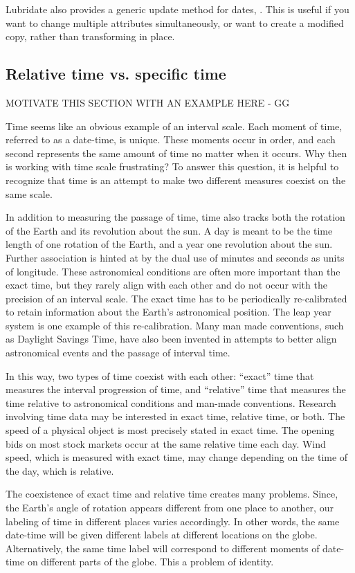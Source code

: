 \documentclass[article]{jss}
\begin{document}
Lubridate also provides a generic update method for dates, .  This is useful if you want to change multiple attributes simultaneously, or want to create a modified copy, rather than transforming in place.

\subsection{Relative time vs. specific time}

MOTIVATE THIS SECTION WITH AN EXAMPLE HERE - GG

Time seems like an obvious example of an interval scale. Each moment of time, referred to as a date-time, is unique.  These moments occur in order, and each second represents the same amount of time no matter when it occurs.  Why then is working with time scale frustrating? To answer this question, it is helpful to recognize that time is an attempt to make two different measures coexist on the same scale. 

In addition to measuring the passage of time, time also tracks both the rotation of the Earth and its revolution about the sun.  A day is meant to be the time length of one rotation of the Earth, and a year one revolution about the sun.  Further association is hinted at by the dual use of minutes and seconds as units of longitude.  These astronomical conditions are often more important than the exact time, but they rarely align with each other and do not occur with the precision of an interval scale.  The exact time has to be periodically re-calibrated to retain information about the Earth's astronomical position.  The leap year system is one example of this re-calibration. Many man made conventions, such as Daylight Savings Time, have also been invented in attempts to better align astronomical events and the passage of interval time.

In this way, two types of time coexist with each other: ``exact'' time that measures the interval progression of time, and ``relative'' time that measures the time relative to astronomical conditions and man-made conventions. Research involving time data may be interested in exact time, relative time, or both. The speed of a physical object is most precisely stated in exact time. The opening bids on most stock markets occur at the same relative time each day.  Wind speed, which is measured with exact time, may change depending on the time of the day, which is relative. 

The coexistence of exact time and relative time creates many problems. Since, the Earth's angle of rotation appears different from one place to another, our labeling of time in different places varies accordingly. In other words, the same date-time will be given different labels at different locations on the globe. Alternatively, the same time label will correspond to different moments of date-time on different parts of the globe.  This a problem of identity.
\end{document}

